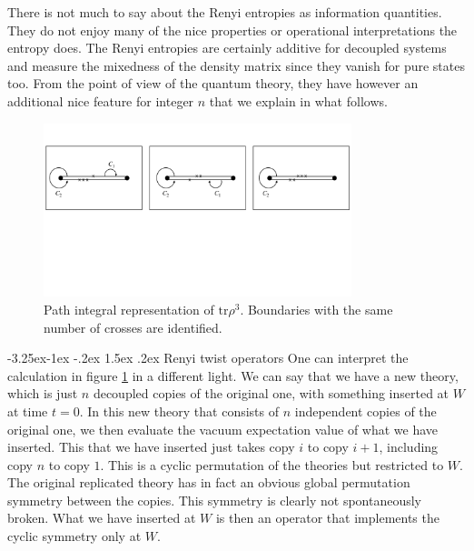 \documentclass[11pt]{article}
\makeatletter
\renewcommand\subsection{\@startsection{subsection}{2}{\z@}%
                                   {-3.25ex\@plus -1ex \@minus -.2ex}%
                                     {1.5ex \@plus .2ex}%
                                     {\normalfont\bfseries}}
\numberwithin{equation}{section}
\makeatother
\begin{document}
There is not much to say about the Renyi entropies as information quantities. They do not enjoy many of the nice properties or operational interpretations the entropy does. The Renyi entropies are certainly additive for decoupled systems and measure the mixedness of the density matrix since they vanish for pure states too. From the point of view of the quantum theory, they have however an additional nice feature for integer $n$ that we explain in what follows.   

\begin{figure}[t]
\begin{center}  
\includegraphics[width=0.8\textwidth]{replica2.pdf}
\captionsetup{width=0.9\textwidth}
\caption{Path integral representation of $\textrm{tr} \rho^3$. Boundaries with the same number of crosses are identified.}
\label{replica1}
\end{center}  
\end{figure}


\subsection{Renyi twist operators}
One can interpret the calculation in figure \ref{replica1} in a different light. We can say that we have a new theory, which is just $n$ decoupled copies of the original one, with something inserted at $W$ at time $t=0$. In this new theory that consists of $n$ independent copies of the original one, we then evaluate the vacuum expectation value of what we have inserted. This that we have inserted just takes copy $i$ to copy $i+1$, including copy $n$ to copy $1$. This is a cyclic permutation of the theories but restricted to $W$. The original replicated theory has in fact an obvious global permutation symmetry between the copies. This symmetry is clearly not spontaneously broken. What we have inserted at $W$ is then an operator that implements the cyclic symmetry only at $W$. 
\end{document}
